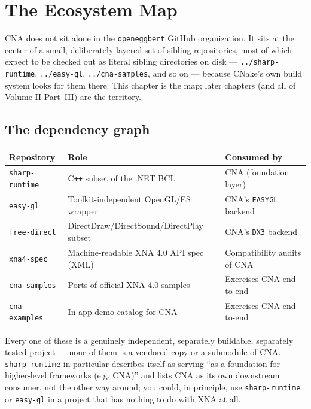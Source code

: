 \chapter{The Ecosystem Map}
\label{ch:ecosystem-map}

CNA does not sit alone in the \texttt{openeggbert} GitHub organization. It sits at the
center of a small, deliberately layered set of sibling repositories, most of which expect to
be checked out as literal sibling directories on disk --- \texttt{../sharp-runtime},
\texttt{../easy-gl}, \texttt{../cna-samples}, and so on --- because CNake's own build system
looks for them there. This chapter is the map; later chapters (and all of Volume II Part~III)
are the territory.

\section{The dependency graph}

\begin{center}
\begin{tabular}{lll}
\toprule
\textbf{Repository} & \textbf{Role} & \textbf{Consumed by} \\
\midrule
\texttt{sharp-runtime} & C\texttt{++} subset of the .NET BCL & CNA (foundation layer) \\
\texttt{easy-gl} & Toolkit-independent OpenGL/ES wrapper & CNA's \texttt{EASYGL} backend \\
\texttt{free-direct} & DirectDraw/DirectSound/DirectPlay subset & CNA's \texttt{DX3} backend \\
\texttt{xna4-spec} & Machine-readable XNA 4.0 API spec (XML) & Compatibility audits of CNA \\
\texttt{cna-samples} & Ports of official XNA 4.0 samples & Exercises CNA end-to-end \\
\texttt{cna-examples} & In-app demo catalog for CNA & Exercises CNA end-to-end \\
\bottomrule
\end{tabular}
\end{center}

Every one of these is a genuinely independent, separately buildable, separately tested
project --- none of them is a vendored copy or a submodule of CNA. \texttt{sharp-runtime} in
particular describes itself as serving ``as a foundation for higher-level frameworks (e.g.
CNA)'' and lists CNA as its own downstream consumer, not the other way around; you could, in
principle, use \texttt{sharp-runtime} or \texttt{easy-gl} in a project that has nothing to do
with XNA at all.

